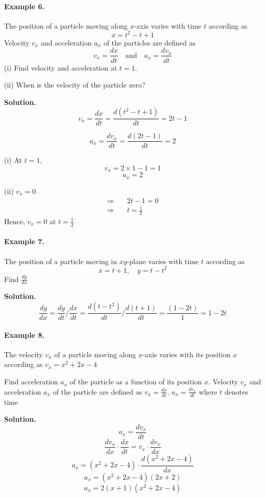 

\paragraph{Example 6.} The position of a particle moving along \(x\)-axis varies with time \( t \)
according as 
\[
x = t^2 - t + 1
\]
Velocity \( v_x \) and acceleration \( a_x \) of the particles are defined as
\[
v_x = \frac{dx}{dt} \quad \text{and} \quad a_x = \frac{dv_x}{dt}
\]
(i) Find velocity and acceleration at \( t = 1 \).

(ii) When is the velocity of the particle zero?

\noindent \textbf{Solution.} 
\[
v_x = \frac{dx}{dt} = \frac{d(t^2 - t + 1)}{dt} = 2t - 1
\]

\[
a_x = \frac{dv_x}{dt} = \frac{d(2t - 1)}{dt} = 2
\]

(i) At \( t = 1 \),
\[
v_x = 2 \times 1 - 1 = 1
\]
\[
a_x = 2
\]

(ii) \( v_x = 0 \)
\begin{align*}
\Rightarrow & \quad 2t - 1 = 0 \\
\Rightarrow & \quad t = \frac{1}{2} 
\end{align*}
Hence, \( v_x = 0 \) at \( t = \frac{1}{2} \)

\paragraph{Example 7.} The position of a particle moving in \( xy \)-plane varies with time \( t \)
according as 
\[
x = t + 1, \quad y = t - t^2
\]
Find \(\frac{dy}{dx}\)

\noindent \textbf{Solution.} 
\[
\frac{dy}{dx} = \frac{dy}{dt} \bigg/ \frac{dx}{dt} = \frac{d(t - t^2)}{dt} \bigg/ \frac{d(t + 1)}{dt} = \frac{(1 - 2t)}{1} = 1 - 2t
\]

\paragraph{Example 8.} The velocity \( v_x \) of a particle moving along \( x \)-axis varies with its
position \( x \) according as \( v_x = x^2 + 2x - 4 \)

Find acceleration \( a_x \) of the particle as a function of its position \( x \). Velocity \( v_x \) and acceleration \( a_x \) of the particle are defined as \( v_x = \frac{dx}{dt}, \, a_x = \frac{dv_x}{dt} \) where \( t \) denotes time

\noindent \textbf{Solution.} 
\[
a_x = \frac{dv_x}{dt}
\]
\[
\frac{dv_x}{dx} \cdot \frac{dx}{dt} = v_x \cdot \frac{dv_x}{dx}
\]
\[
a_x = (x^2 + 2x - 4) \cdot \frac{d (x^2 + 2x - 4)}{dx}
\]
\[
a_x = (x^2 + 2x - 4)(2x + 2)
\]
\[
a_x = 2 (x + 1) (x^2 + 2x - 4)
\]

